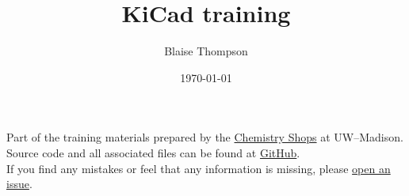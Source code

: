 \documentclass{training}
\title{KiCad training}
\date{\today}
\author{Blaise Thompson}
\begin{document}
\maketitle
\renewcommand{\baselinestretch}{0.5}\normalsize
\tableofcontents
\renewcommand{\baselinestretch}{1.0}\normalsize
\vfill

Part of the training materials prepared by the \href{https://shops.chem.wisc.edu/}{Chemistry Shops} at UW--Madison. \\
Source code and all associated files can be found at \href{https://github.com/uw-madison-chem-shops/training}{GitHub}. \\
If you find any mistakes or feel that any information is missing, please \href{https://github.com/uw-madison-chem-shops/training/issues}{open an issue}. \\

\clearpage
\end{document}

